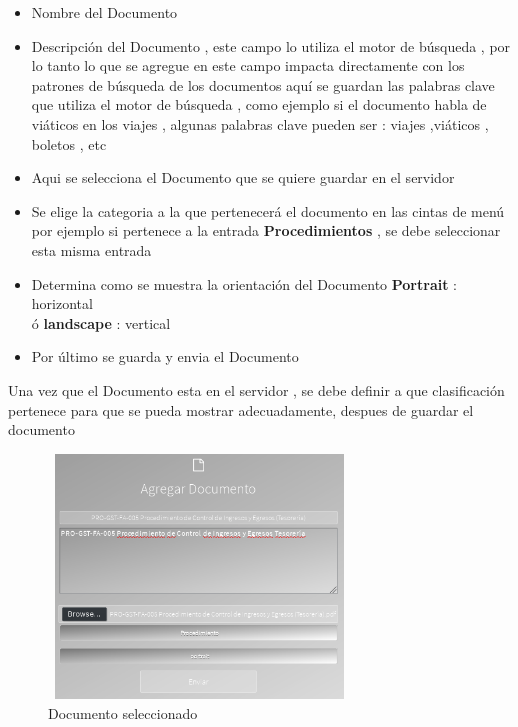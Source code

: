 \documentclass[12pt,letterpaper]{article}
\begin{document}
\begin{subsection}{\color{blackgreen}}
{        \begin{itemize}
          \item[\ding{182}]
          {
            Nombre del Documento
          }
          \item[\ding{183}]
          {
            Descripci\'on del Documento , este campo lo utiliza el motor de b\'usqueda , por lo tanto lo que se agregue en este campo impacta directamente con los patrones de b\'usqueda de los documentos
            aqu\'i se guardan las palabras clave que utiliza el motor de b\'usqueda , como ejemplo si el documento habla de vi\'aticos en los viajes , algunas palabras clave pueden ser : viajes ,vi\'aticos , boletos , etc
          }
          \item[\ding{184}]
          {
            Aqui se selecciona el Documento que se quiere guardar en el servidor
          }
          \item[\ding{185}]
          {
            Se elige la categoria a la que pertenecer\'a el documento en las cintas de men\'u por ejemplo si pertenece a la entrada \textbf{Procedimientos} , se debe seleccionar esta misma entrada
          }
          \item[\ding{186}]
          {
            Determina como se muestra la orientaci\'on del Documento \textbf{Portrait} : horizontal \\ \'o \textbf{landscape} : vertical
          }
          \item[\ding{187}]
          {
            Por \'ultimo se guarda y envia el Documento
          }
       \end{itemize}

       \newpage
       Una vez que el Documento esta en el servidor , se debe definir a que clasificaci\'on pertenece  para que se pueda mostrar adecuadamente,
       despues de guardar el documento
       \begin{figure}[htb]
         \centering
         \includegraphics[angle=0,width=80mm,height=65mm]{img/Selection_057.png}
         \caption{Documento seleccionado}
         \label{sel57}
       \end{figure}

}
\end{subsection}
\end{document}
